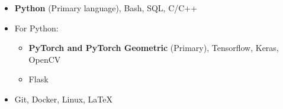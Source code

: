 \begin{itemize}
	\item \textbf{Python} (Primary language), Bash, SQL, C/C++ %
	\item For Python:
	\begin{itemize}
		\item \textbf{PyTorch and PyTorch Geometric} (Primary), Tensorflow, Keras, OpenCV
		\item Flask
	\end{itemize}    
	\item Git, Docker, Linux, \LaTeX
\end{itemize}

